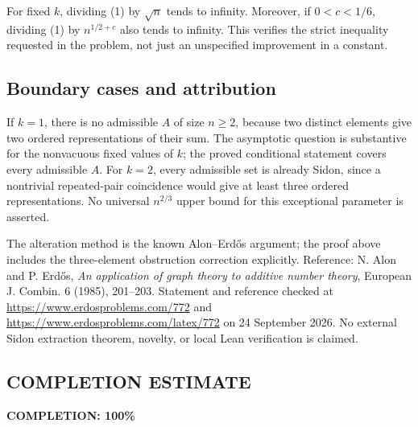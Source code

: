 For fixed \(k\), dividing (1) by \(\sqrt n\) tends to infinity. Moreover, if \(0<c<1/6\), dividing (1) by \(n^{1/2+c}\) also tends to infinity. This verifies the strict inequality requested in the problem, not just an unspecified improvement in a constant.

\subsection*{Boundary cases and attribution}
If \(k=1\), there is no admissible \(A\) of size \(n\geq2\), because two distinct elements give two ordered representations of their sum. The asymptotic question is substantive for the nonvacuous fixed values of \(k\); the proved conditional statement covers every admissible \(A\). For \(k=2\), every admissible set is already Sidon, since a nontrivial repeated-pair coincidence would give at least three ordered representations. No universal \(n^{2/3}\) upper bound for this exceptional parameter is asserted.

The alteration method is the known Alon--Erd\H{o}s argument; the proof above includes the three-element obstruction correction explicitly. Reference: N. Alon and P. Erd\H{o}s, \emph{An application of graph theory to additive number theory}, European J. Combin. 6 (1985), 201--203. Statement and reference checked at \url{https://www.erdosproblems.com/772} and \url{https://www.erdosproblems.com/latex/772} on 24 September 2026. No external Sidon extraction theorem, novelty, or local Lean verification is claimed.
\subsection*{COMPLETION ESTIMATE}
\textbf{COMPLETION: 100\%}
